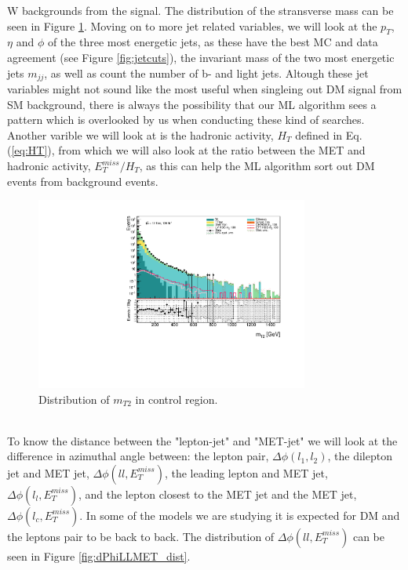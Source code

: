 \documentclass[14pt, a4paper]{book}
\begin{document}
W backgrounds from the signal. The distribution of the stransverse mass can be seen in Figure \ref{fig:mt2_dist}. Moving on to more jet related variables, we will look at the $p_T$, $\eta$ and $\phi$ of the three most energetic jets, as these have the best MC and data agreement (see Figure \ref{fig:jetcuts}), the invariant mass of the two most energetic jets $m_{jj}$, as well as count the number of b- and light jets. Altough these jet 
variables might not sound like the most useful when singleing out DM signal from SM background, there is always the possibility that our ML algorithm sees a pattern which is overlooked by us when conducting these kind of searches. 
Another varible we will look at is the hadronic activity, $H_T$ defined in Eq. (\ref{eq:HT}), from which we will also look at the ratio between the MET and hadronic activity, $E_T^{miss}/H_T$, as this can help the ML algorithm sort out DM events from background events.\\
\begin{figure}[!ht]
    \centering
        \includegraphics[width=0.8\textwidth]{mt2.pdf}
    \caption{Distribution of $m_{T2}$ in control region.}\label{fig:mt2_dist}
\end{figure}
\\To know the distance between the "lepton-jet" and "MET-jet" we will look at the difference in azimuthal angle between: the lepton pair, $\Delta\phi(l_1,l_2)$, the dilepton jet and MET jet, $\Delta\phi(ll,E_T^{miss})$, the leading lepton and MET jet, $\Delta\phi(l_l,E_T^{miss})$, 
and the lepton closest to the MET jet and the MET jet, $\Delta\phi(l_c,E_T^{miss})$. In some of the models we are studying it is expected for DM and the leptons pair to be back to back. The distribution of $\Delta\phi(ll,E_T^{miss})$ can be seen in Figure \ref{fig:dPhiLLMET_dist}.
\end{document}
